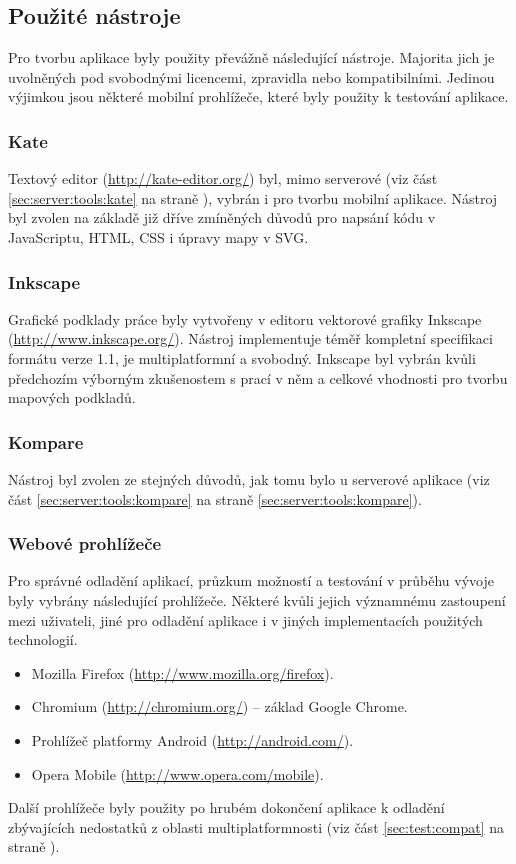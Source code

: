 \subsection{Použité nástroje}
Pro tvorbu aplikace byly použity převážně následující nástroje. Majorita jich je uvolněných pod svobodnými licencemi, zpravidla   nebo kompatibilními. Jedinou výjimkou jsou některé mobilní prohlížeče, které byly použity k testování aplikace.

\subsubsection{Kate}
Textový editor  (\url{http://kate-editor.org/}) byl, mimo serverové (viz část \ref{sec:server:tools:kate} na straně \pageref{sec:server:tools:kate}), vybrán i pro tvorbu mobilní aplikace. Nástroj byl zvolen na základě již dříve zmíněných důvodů pro napsání kódu v JavaScriptu, \gls{HTML}, \gls{CSS} i úpravy mapy v \gls{SVG}.

\subsubsection{Inkscape}
Grafické podklady práce byly vytvořeny v editoru vektorové grafiky Inkscape (\url{http://www.inkscape.org/}). Nástroj implementuje téměř kompletní specifikaci formátu  verze 1.1, je multiplatformní a svobodný. Inkscape byl vybrán kvůli předchozím výborným zkušenostem s prací v něm a celkové vhodnosti pro tvorbu mapových podkladů.

\subsubsection{Kompare}
Nástroj byl zvolen ze stejných důvodů, jak tomu bylo u serverové aplikace (viz část \ref{sec:server:tools:kompare} na straně \ref{sec:server:tools:kompare}).

\subsubsection{Webové prohlížeče}
Pro správné odladění aplikací, průzkum možností a testování v průběhu vývoje byly vybrány následující prohlížeče. Některé kvůli jejich významnému zastoupení mezi uživateli, jiné pro odladění aplikace i v jiných implementacích použitých technologií.
\begin{itemize}
 \item Mozilla Firefox (\url{http://www.mozilla.org/firefox}).
 \item Chromium (\url{http://chromium.org/}) -- základ Google Chrome.
 \item Prohlížeč platformy Android (\url{http://android.com/}).
 \item Opera Mobile (\url{http://www.opera.com/mobile}).
\end{itemize}
Další prohlížeče byly použity po hrubém dokončení aplikace k odladění zbývajících nedostatků z oblasti multiplatformnosti (viz část \ref{sec:test:compat} na straně \pageref{sec:test:compat}).

